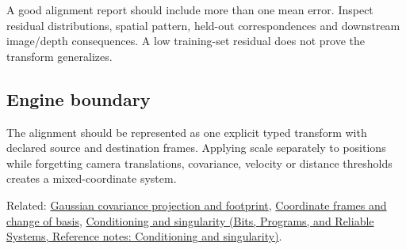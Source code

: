 A good alignment report should include more than one mean error. Inspect residual distributions, spatial pattern, held-out correspondences and downstream image/depth consequences. A low training-set residual does not prove the transform generalizes.

\subsection{Engine boundary}\label{appendix-5f40b4fea463-engine-boundary}

\hypertarget{appendix-5f40b4fea463-engine-boundary}{}

The alignment should be represented as one explicit typed transform with declared source and destination frames. Applying scale separately to positions while forgetting camera translations, covariance, velocity or distance thresholds creates a mixed-coordinate system.

Related: \hyperref[appendix-24269cb6977c]{Gaussian covariance projection and footprint}, \hyperref[appendix-1bae9457dbc3]{Coordinate frames and change of basis}, \href{../01-Bits-Programs-and-Reliable-Systems/main.pdf\#nameddest=appendix-8f6a01f284a7}{Conditioning and singularity (Bits, Programs, and Reliable Systems, Reference notes: Conditioning and singularity)}.
